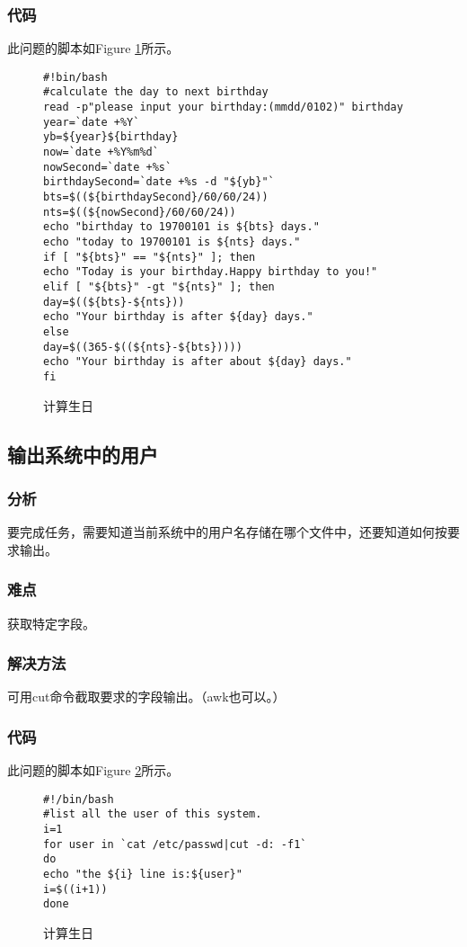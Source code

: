 \subsubsection{代码}
此问题的脚本如Figure \ref{SS1}所示。
\begin{figure}
\begin{verbatim}
#!bin/bash
#calculate the day to next birthday
read -p"please input your birthday:(mmdd/0102)" birthday
year=`date +%Y`
yb=${year}${birthday}
now=`date +%Y%m%d`
nowSecond=`date +%s`
birthdaySecond=`date +%s -d "${yb}"`
bts=$((${birthdaySecond}/60/60/24))
nts=$((${nowSecond}/60/60/24))
echo "birthday to 19700101 is ${bts} days."
echo "today to 19700101 is ${nts} days."
if [ "${bts}" == "${nts}" ]; then
echo "Today is your birthday.Happy birthday to you!"
elif [ "${bts}" -gt "${nts}" ]; then
day=$((${bts}-${nts}))
echo "Your birthday is after ${day} days."
else
day=$((365-$((${nts}-${bts}))))
echo "Your birthday is after about ${day} days."
fi
\end{verbatim}
\caption{计算生日}
\label{SS1}
\end{figure}

\subsection{输出系统中的用户}
\subsubsection{分析}
要完成任务，需要知道当前系统中的用户名存储在哪个文件中，还要知道如何按要求输出。
\subsubsection{难点}
获取特定字段。
\subsubsection{解决方法}
可用cut命令截取要求的字段输出。（awk也可以。）
\subsubsection{代码}
此问题的脚本如Figure \ref{SS2}所示。
\begin{figure}
\begin{verbatim}
#!/bin/bash
#list all the user of this system.
i=1
for user in `cat /etc/passwd|cut -d: -f1`
do
echo "the ${i} line is:${user}"
i=$((i+1))
done\end{verbatim}
\caption{计算生日}
\label{SS2}
\end{figure}